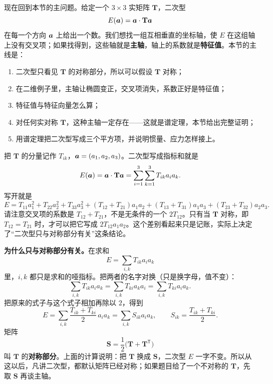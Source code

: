 \documentclass[11pt]{ctexart}
\newcommand{\ten}[1]{\mathbf{#1}}
\let\orighdr\hdr
\renewcommand{\hdr}[2]{\par\needspace{10\baselineskip}\orighdr{#1}{#2}}
\let\origsubhdr\subhdr
\renewcommand{\subhdr}[1]{\par\needspace{3\baselineskip}\origsubhdr{#1}}
\begin{document}

现在回到本节的主问题。给定一个 $3\times3$ 实矩阵 $\ten T$，二次型
\[
E(\vect a)=\vect a\cdot\ten T\vect a
\]
在每一个方向 $\boldsymbol{a}$ 上给出一个数。我们想找一组互相垂直的坐标轴，使 $E$ 在这组轴上没有交叉项；如果找得到，这些轴就是\textbf{主轴}，轴上的系数就是\textbf{特征值}。本节的主线是：

\begin{enumerate}[label=\arabic*.,leftmargin=1.8em,itemsep=2pt]
\item 二次型只看见 $\ten T$ 的对称部分，所以可以假设 $\ten T$ 对称；
\item 在二维例子里，主轴让椭圆变正，交叉项消失，系数正好是特征值；
\item 特征值与特征向量怎么算；
\item 对任何实对称 $\ten T$，这种主轴一定存在——这就是谱定理，本节给出完整证明；
\item 用谱定理把二次型写成三个平方项，并说明惯量、应力怎样接上。
\end{enumerate}


把 $\ten T$ 的分量记作 $T_{ik}$，$\boldsymbol{a}=(a_1,a_2,a_3)$。二次型写成指标和就是
\[
E(\vect a)=\vect a\cdot\ten T\vect a
=\sum_{i=1}^{3}\sum_{k=1}^{3}T_{ik}a_ia_k .
\]
写开就是
\[
E=T_{11}a_1^2+T_{22}a_2^2+T_{33}a_3^2
+(T_{12}+T_{21})a_1a_2
+(T_{13}+T_{31})a_1a_3
+(T_{23}+T_{32})a_2a_3 .
\]
请注意交叉项的系数是 $T_{12}+T_{21}$，不是无条件的一个 $2T_{12}$。只有当 $\ten T$ 对称，即 $T_{12}=T_{21}$ 时，才可以把它写成 $2T_{12}a_1a_2$。这个差别看起来只是记账，实际上决定了“二次型只与对称部分有关”这条结论。

\textbf{为什么只与对称部分有关。}在求和
\[
E=\sum_{i,k}T_{ik}a_ia_k
\]
里，$i,k$ 都只是求和的哑指标。把两者的名字对换（只是换字母，值不变）：
\[
\sum_{i,k}T_{ik}a_ia_k
=\sum_{i,k}T_{ki}a_ka_i
=\sum_{i,k}T_{ki}a_ia_k .
\]
把原来的式子与这个式子相加再除以 $2$，得到
\[
E=\sum_{i,k}\frac{T_{ik}+T_{ki}}{2}\,a_ia_k
=\sum_{i,k}S_{ik}a_ia_k,
\qquad
S_{ik}=\frac{T_{ik}+T_{ki}}{2}.
\]
矩阵
\[
\ten S=\frac12\bigl(\ten T+\ten T^{\mathsf T}\bigr)
\]
叫 $\ten T$ 的\textbf{对称部分}。上面的计算说明：把 $\ten T$ 换成 $\ten S$，二次型 $E$ 一字不变。所以从这以后，凡讲二次型，都默认矩阵已经对称；如果题目给了一个不对称的 $\ten T$，先取 $\ten S$ 再谈主轴。
\end{document}
